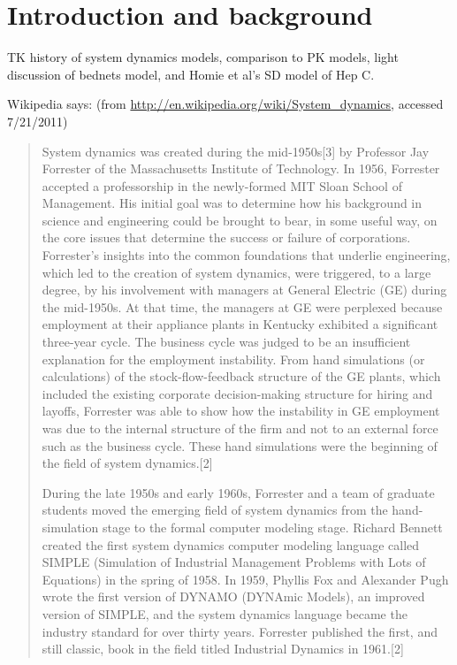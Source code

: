\section{Introduction and background}

TK history of system dynamics models, comparison to PK models, light
discussion of bednets model, and Homie et al's SD model of Hep C.

Wikipedia says: (from \url{http://en.wikipedia.org/wiki/System_dynamics}, accessed 7/21/2011)
\begin{quote}
System dynamics was created during the mid-1950s[3] by Professor Jay
Forrester of the Massachusetts Institute of Technology. In 1956,
Forrester accepted a professorship in the newly-formed MIT Sloan
School of Management. His initial goal was to determine how his
background in science and engineering could be brought to bear, in
some useful way, on the core issues that determine the success or
failure of corporations. Forrester's insights into the common
foundations that underlie engineering, which led to the creation of
system dynamics, were triggered, to a large degree, by his involvement
with managers at General Electric (GE) during the mid-1950s. At that
time, the managers at GE were perplexed because employment at their
appliance plants in Kentucky exhibited a significant three-year
cycle. The business cycle was judged to be an insufficient explanation
for the employment instability. From hand simulations (or
calculations) of the stock-flow-feedback structure of the GE plants,
which included the existing corporate decision-making structure for
hiring and layoffs, Forrester was able to show how the instability in
GE employment was due to the internal structure of the firm and not to
an external force such as the business cycle. These hand simulations
were the beginning of the field of system dynamics.[2]

During the late 1950s and early 1960s, Forrester and a team of
graduate students moved the emerging field of system dynamics from the
hand-simulation stage to the formal computer modeling stage. Richard
Bennett created the first system dynamics computer modeling language
called SIMPLE (Simulation of Industrial Management Problems with Lots
of Equations) in the spring of 1958. In 1959, Phyllis Fox and
Alexander Pugh wrote the first version of DYNAMO (DYNAmic Models), an
improved version of SIMPLE, and the system dynamics language became
the industry standard for over thirty years. Forrester published the
first, and still classic, book in the field titled Industrial Dynamics
in 1961.[2]


\end{quote}
